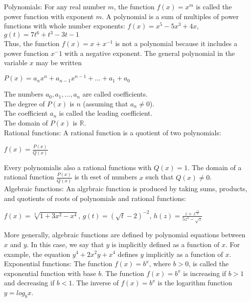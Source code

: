 \documentclass{article}
\begin{document}
Polynomials: For any real number $m$, the function $f(x) = x^m$ is called the power function with exponent $m$. A polynomial is a sum of multiples of power functions with whole number exponents: $f(x) = x^5 -5x^3 + 4x$, $g(t) = 7t^6 +t^3 - 3t -1$\\

Thus, the function $f(x) = x + x^{-1}$ is not a polynomial because it includes a power function $x^-1$ with a negative exponent. The general polynomial in the variable $x$ may be written\\
\begin{center}$P(x) = a_nx^n + a_{n-1}x^{n-1} + \dots + a_1 + a_0$\end{center}
The numbers $a_0, a_1, \dots, a_n$ are called coefficients.\\
The degree of $P(x)$ is $n$ (assuming that $a_n \neq 0$).\\
The coefficient $a_n$ is called the leading coefficient.\\
The domain of $P(x)$ is $\mathbb{R}$.\\

Rational functions: A rational function is a quotient of two polynomials:\\
\begin{center}$f(x) = \frac{P(x)}{Q(x)}$\end{center}
Every polynomialis also a rational functions with $Q(x) = 1$. The domain of a rational function $\frac{P(x)}{Q(x)}$ is th eset of numbers $x$ such that $Q(x) \neq 0$.\\

Algebraic functions: An algrbraic function is produced by taking sums, products, and quotients of roots of polynomials and rational functions:\\
\begin{center} $f(x) = \sqrt[2]{1 + 3x^2 - x^4}$, $g(t) = (\sqrt{t} - 2)^{-2}$, $h(z) = \frac{z + z^{\frac{-5}{3}}}{5z^3 - \sqrt{z}}$\end{center}

More generally, algebraic functions are defined by polynomial equations between $x$ and $y$. In this case, we say that $y$ is implicitly defined as a function of $x$. For example, the equation $y^4 + 2x^{2}y + x^4$ defines $y$ implicitly as a function of $x$.\\

Exponential functions: The function $f(x) = b^x$, where $b > 0$, is called the exponential function with base $b$. The function $f(x) = b^x$ is increasing if $b > 1$ and decreasing if $b < 1$. The inverse of $f(x) = b^x$ is the logarithm function $y = log_{b}x$.\\
\end{document}
